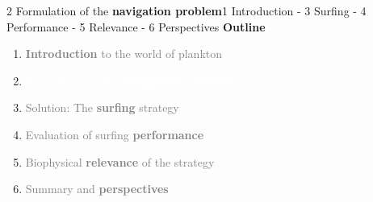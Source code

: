 
\begin{frame}{2 Formulation of the \textbf{navigation problem}}{1 Introduction - 3 Surfing - 4 Performance - 5 Relevance - 6 Perspectives}
	\centering
	\vspace{15pt}
	\textbf{\Large Outline}

	\vspace{15pt}

	\large
	\begin{enumerate}
		\setlength\itemsep{10pt}
		\item \textcolor{gray}{\textbf{Introduction} to the world of plankton}
		\item \textcolor{white}{Formulation of the \textbf{navigation problem}}
		\item \textcolor{gray}{Solution: The \textbf{surfing} strategy}
		\item \textcolor{gray}{Evaluation of surfing \textbf{performance}}
		\item \textcolor{gray}{Biophysical \textbf{relevance} of the strategy}
		\item \textcolor{gray}{Summary and \textbf{perspectives}}
	\end{enumerate}

\end{frame}


